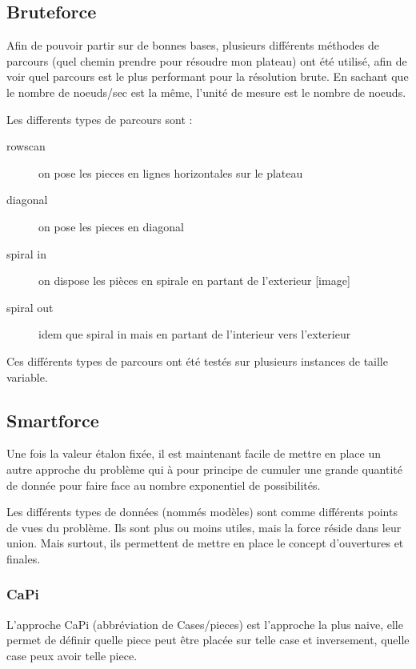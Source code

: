 \documentclass{article}
\begin{document}
	\subsection{Bruteforce}
	
	Afin de pouvoir partir sur de bonnes bases, plusieurs différents méthodes de parcours (quel chemin prendre pour résoudre mon plateau) ont été utilisé, afin de voir quel parcours est le plus performant pour la résolution brute. En sachant que le nombre de noeuds/sec est la même, l'unité de mesure est le nombre de noeuds.
	
	Les differents types de parcours sont :
	
	\begin{description}
		\item[rowscan] on pose les pieces en lignes horizontales sur le plateau
		\item[diagonal] on pose les pieces en diagonal
		\item[spiral in] on dispose les pièces en spirale en partant de l'exterieur [image]
		\item[spiral out] idem que spiral in mais en partant de l'interieur vers l'exterieur
	\end{description}
	
	Ces différents types de parcours ont été testés sur plusieurs instances de taille variable. 
	
	\subsection{Smartforce}
	
	Une fois la valeur étalon fixée, il est maintenant facile de mettre en place un autre approche du problème qui à pour principe de cumuler une grande quantité de donnée pour faire face au nombre exponentiel de possibilités.
	
	Les différents types de données (nommés modèles) sont comme différents points de vues du problème. Ils sont plus ou moins utiles, mais la force réside dans leur union. Mais surtout, ils permettent de mettre en place le concept d'ouvertures et finales.
	
	\subsubsection{CaPi}
	
	L'approche CaPi (abbréviation de Cases/pieces) est l'approche la plus naive, elle permet de définir quelle piece peut être placée sur telle case et inversement, quelle case peux avoir telle piece.
	
\end{document}
